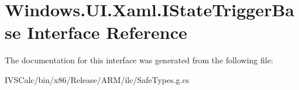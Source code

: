 \hypertarget{interface_windows_1_1_u_i_1_1_xaml_1_1_i_state_trigger_base}{}\section{Windows.\+U\+I.\+Xaml.\+I\+State\+Trigger\+Base Interface Reference}
\label{interface_windows_1_1_u_i_1_1_xaml_1_1_i_state_trigger_base}


The documentation for this interface was generated from the following file\+:\begin{DoxyCompactItemize}
\item 
I\+V\+S\+Calc/bin/x86/\+Release/\+A\+R\+M/ilc/Safe\+Types.\+g.\+cs\end{DoxyCompactItemize}
